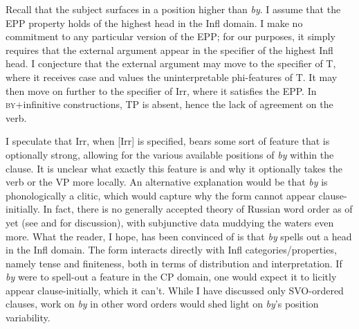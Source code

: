 \documentclass[output=paper,
modfonts,
newtxmath,
hidelinks,
]{langscibook}
\begin{document}
\ea \label{ex23}
\z\z

\noindent Recall that the subject surfaces in a position higher than \textit{by}. I assume that the EPP property holds of the highest head in the Infl domain. I make no commitment to any particular version of the EPP; for our purposes, it simply requires that the external argument appear in the specifier of the highest Infl head. I conjecture that the external argument may move to the specifier of T, where it receives case and values the uninterpretable phi-features of T. It may then move on further to the specifier of Irr, where it satisfies the EPP. In \textsc{by}+infinitive constructions, TP is absent, hence the lack of agreement on the verb.

I speculate that Irr, when [Irr] is specified, bears some sort of feature that is optionally strong, allowing for the various available positions of \textit{by} within the clause. It is unclear what exactly this feature is and why it optionally takes the verb or the VP more locally. An alternative explanation would be that \textit{by} is phonologically a clitic, which would capture why the form cannot appear clause-initially. In fact, there is no generally accepted theory of Russian word order as of yet (see \citealt{KallestinovaSlabakova2008} and \citealt{Bailyn2011} for discussion), with subjunctive data muddying the waters even more. What the reader, I hope, has been convinced of is that \textit{by} spells out a head in the Infl domain. The form interacts directly with Infl categories/properties, namely tense and finiteness, both in terms of distribution and interpretation. If \textit{by} were to spell-out a feature in the CP domain, one would expect it to licitly appear clause-initially, which it can’t. While I have discussed only SVO-ordered clauses, work on \textit{by} in other word orders would shed light on \textit{by}’s position variability.
\end{document}
